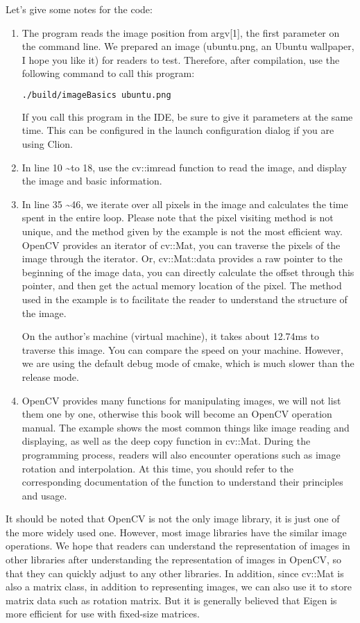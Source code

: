 Let's give some notes for the code:
\begin{enumerate}
\item The program reads the image position from argv[1], the first parameter on the command line. We prepared an image (ubuntu.png, an Ubuntu wallpaper, I hope you like it) for readers to test. Therefore, after compilation, use the following command to call this program:
\begin{lstlisting}[language=sh, caption=Terminal input:]
./build/imageBasics ubuntu.png
\end{lstlisting}
If you call this program in the IDE, be sure to give it parameters at the same time. This can be configured in the launch configuration dialog if you are using Clion.
\item In line 10 \textasciitilde to 18, use the cv::imread function to read the image, and display the image and basic information.
\item In line 35 \textasciitilde 46, we iterate over all pixels in the image and calculates the time spent in the entire loop. Please note that the pixel visiting method is not unique, and the method given by the example is not the most efficient way. OpenCV provides an iterator of cv::Mat, you can traverse the pixels of the image through the iterator. Or, cv::Mat::data provides a raw pointer to the beginning of the image data, you can directly calculate the offset through this pointer, and then get the actual memory location of the pixel. The method used in the example is to facilitate the reader to understand the structure of the image.

On the author's machine (virtual machine), it takes about 12.74ms to traverse this image. You can compare the speed on your machine. However, we are using the default debug mode of cmake, which is much slower than the release mode.

\item OpenCV provides many functions for manipulating images, we will not list them one by one, otherwise this book will become an OpenCV operation manual. The example shows the most common things like image reading and displaying, as well as the deep copy function in cv::Mat. During the programming process, readers will also encounter operations such as image rotation and interpolation. At this time, you should refer to the corresponding documentation of the function to understand their principles and usage.
\end{enumerate}

It should be noted that OpenCV is not the only image library, it is just one of the more widely used one. However, most image libraries have the similar image operations. We hope that readers can understand the representation of images in other libraries after understanding the representation of images in OpenCV, so that they can quickly adjust to any other libraries. In addition, since cv::Mat is also a matrix class, in addition to representing images, we can also use it to store matrix data such as rotation matrix. But it is generally believed that Eigen is more efficient for use with fixed-size matrices.

